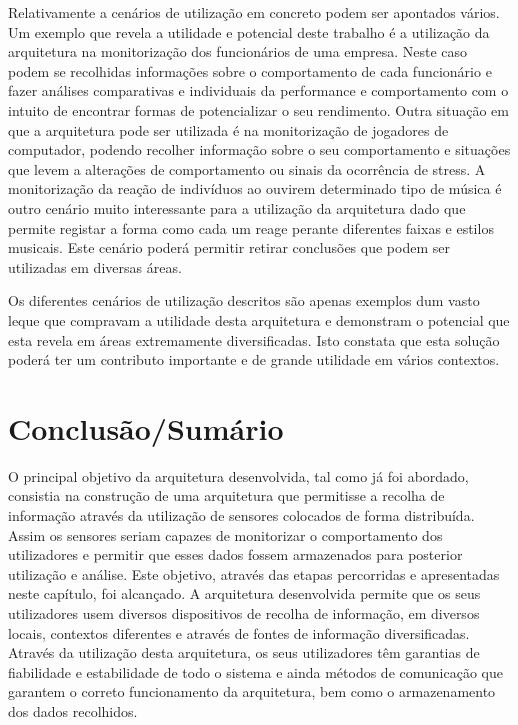 Relativamente a cenários de utilização em concreto podem ser apontados vários. Um exemplo que revela a utilidade e potencial deste trabalho é a utilização da arquitetura na monitorização dos funcionários de uma empresa. Neste caso podem se recolhidas informações sobre o comportamento de cada funcionário e fazer análises comparativas e individuais da performance e comportamento com o intuito de encontrar formas de potencializar o seu rendimento. Outra situação em que a arquitetura pode ser utilizada é na monitorização de jogadores de computador, podendo recolher informação sobre o seu comportamento e situações que levem a alterações de comportamento ou sinais da ocorrência de stress. A monitorização da reação de indivíduos ao ouvirem determinado tipo de música é outro cenário muito interessante para a utilização da arquitetura dado que permite registar a forma como cada um reage perante diferentes faixas e estilos musicais. Este cenário poderá permitir retirar conclusões que podem ser utilizadas em diversas áreas.

Os diferentes cenários de utilização descritos são apenas exemplos dum vasto leque que compravam a utilidade desta arquitetura e demonstram o potencial que esta revela em áreas extremamente diversificadas. Isto constata que esta solução poderá ter um contributo importante e de grande utilidade em vários contextos.

\section{Conclusão/Sumário}

O principal objetivo da arquitetura desenvolvida, tal como já foi abordado, consistia na construção de uma arquitetura que permitisse a recolha de informação através da utilização de sensores colocados de forma distribuída. Assim os sensores seriam capazes de monitorizar o comportamento dos utilizadores e permitir que esses dados fossem armazenados para posterior utilização e análise. Este objetivo, através das etapas percorridas e apresentadas neste capítulo, foi alcançado. A arquitetura desenvolvida permite que os seus utilizadores usem diversos dispositivos de recolha de informação, em diversos locais, contextos diferentes e através de fontes de informação diversificadas. Através da utilização desta arquitetura, os seus utilizadores têm garantias de fiabilidade e estabilidade de todo o sistema e ainda métodos de comunicação que garantem o correto funcionamento da arquitetura, bem como o armazenamento dos dados recolhidos.

